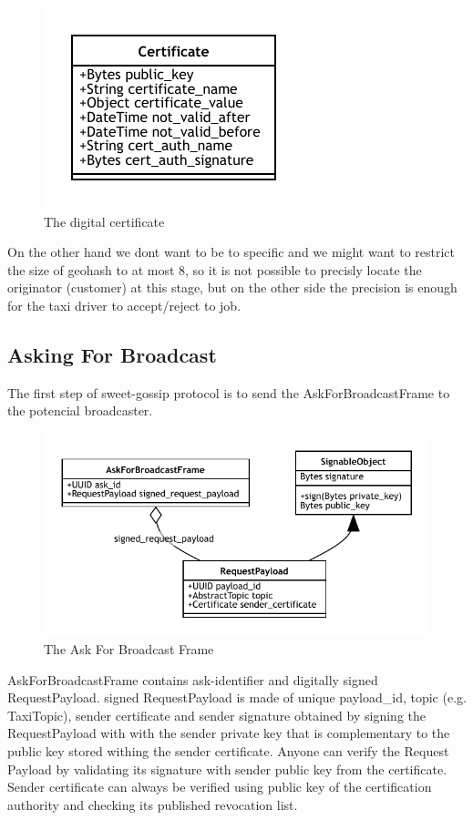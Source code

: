\documentclass{article}
\begin{document}
\begin{figure}
	\centering
	\includegraphics[scale=1.0]{Certificate.pdf}
	\caption{The digital certificate}
	\label{fig:fr:certificate}
\end{figure}


On the other hand we dont want to be to specific and we might want to restrict the size of geohash to at most 8, so it is not possible to precisly locate the originator (customer) at this stage, but on the other side the precision is enough for the taxi driver to accept/reject to job.

\subsection{Asking For Broadcast}
The first step of sweet-gossip protocol is to send the AskForBroadcastFrame to the potencial broadcaster.

\begin{figure}
	\centering
	\includegraphics[scale=1.0]{AskForBroadcast.pdf}
	\caption{The Ask For Broadcast Frame}
	\label{fig:fr:askforbroadcast}
\end{figure}

AskForBroadcastFrame contains ask-identifier and digitally signed RequestPayload. signed RequestPayload is made of unique payload\_id, topic (e.g. TaxiTopic), sender certificate and sender signature obtained by signing the RequestPayload with with the sender private key that is complementary to the public key stored withing the sender certificate. Anyone can verify the Request Payload by validating its signature with sender public key from the certificate. Sender certificate can always be verified using  public key of the certification authority and checking its published revocation list.
\end{document}
